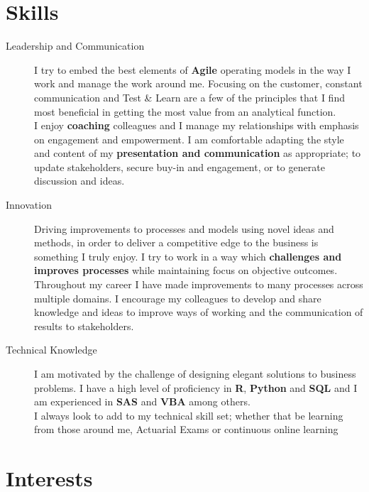 \documentclass[11pt]{article}
\begin{document}
\section*{Skills}
\begin{description}
\item[Leadership and Communication] I try to embed the best elements of \textbf{Agile} operating models in the way I work and manage the work around me.  Focusing on the customer, constant communication and Test \& Learn are a few of the principles that I find most beneficial in getting the most value from an analytical function.\\
I enjoy \textbf{coaching} colleagues and I manage my relationships with emphasis on engagement and empowerment.
I am comfortable adapting the style and content of my \textbf{presentation and communication} as appropriate; to update stakeholders, secure buy-in and engagement, or to generate discussion and ideas. 
\item[Innovation] Driving improvements to processes and models using novel ideas and methods, in order to deliver a competitive edge to the business is something I truly enjoy. 
I try to work in a way which \textbf{challenges and improves processes} while maintaining focus on objective outcomes.\\
Throughout my career I have made improvements to many processes across multiple domains. I encourage my colleagues to develop and share knowledge and ideas to improve ways of working and the communication of results to stakeholders.
\item[Technical Knowledge] I am motivated by the challenge of designing elegant solutions to business problems.
I have a high level of proficiency in \textbf{R}, \textbf{Python} and \textbf{SQL} and I am experienced in \textbf{SAS} and \textbf{VBA} among others.\\
I always look to add to my technical skill set; whether that be learning from those around me, Actuarial Exams or continuous online learning

\end{description} 

\section*{Interests}
\end{document}
